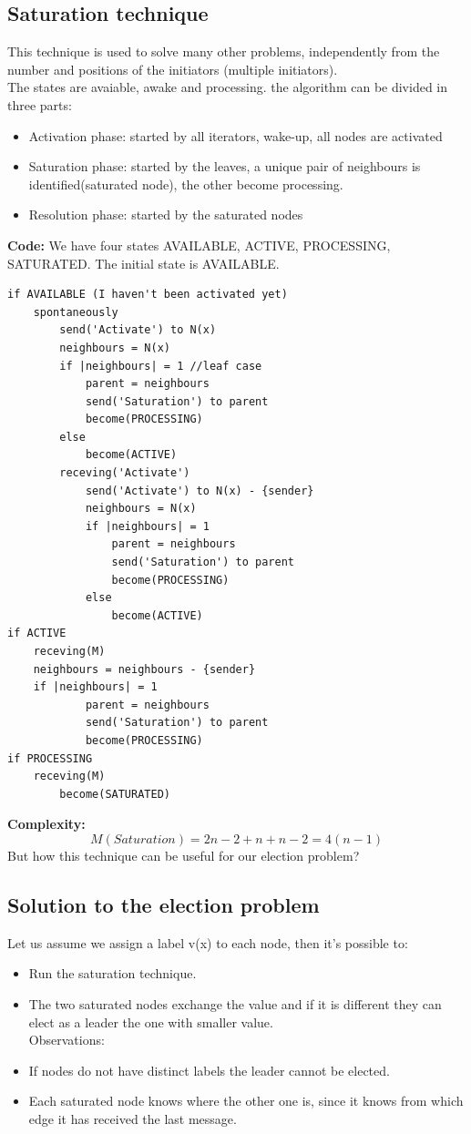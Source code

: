 \documentclass[paper=a4, fontsize=11pt]{scrartcl} %
\numberwithin{equation}{section} %
\numberwithin{figure}{section} %
\numberwithin{table}{section} %
\begin{document}
\subsection*{Saturation technique}
This technique is used to solve many other problems, independently from the number and positions of the initiators (multiple initiators).\\
The states are avaiable, awake and processing. the algorithm can be divided in three parts:
\begin{itemize}
\item Activation phase: started by all iterators, wake-up, all nodes are activated
\item Saturation phase: started by the leaves, a unique pair of neighbours is identified(saturated node), the other become processing.
\item Resolution phase: started by the saturated nodes
\end{itemize}
\textbf{Code:} We have four states AVAILABLE, ACTIVE, PROCESSING, SATURATED. The initial state is AVAILABLE.
\begin{lstlisting}
if AVAILABLE (I haven't been activated yet)
	spontaneously
		send('Activate') to N(x)
		neighbours = N(x)
		if |neighbours| = 1 //leaf case
			parent = neighbours
			send('Saturation') to parent
			become(PROCESSING)
		else
			become(ACTIVE)	
		receving('Activate')
			send('Activate') to N(x) - {sender}
			neighbours = N(x)
			if |neighbours| = 1
				parent = neighbours
				send('Saturation') to parent
				become(PROCESSING)
			else
				become(ACTIVE)
if ACTIVE
	receving(M)
	neighbours = neighbours - {sender}
	if |neighbours| = 1
			parent = neighbours
			send('Saturation') to parent
			become(PROCESSING)
if PROCESSING
	receving(M)
		become(SATURATED)					
\end{lstlisting}
\textbf{Complexity:} $$M(Saturation) = 2n -2+n+n-2 = 4(n-1)$$ 
But how this technique can be useful for our election problem?
\subsection*{Solution to the election problem}
Let us assume we assign a label v(x) to each node, then it's possible to:
\begin{itemize}
\item Run the saturation technique.
\item The two saturated nodes exchange the value and if it is different they can elect as a leader the one with smaller value.\\
Observations:
\item If nodes do not have distinct labels the leader cannot be elected.
\item Each saturated node knows where the other one is, since it knows from which edge it has received the last message.
\end{itemize}
\end{document}
